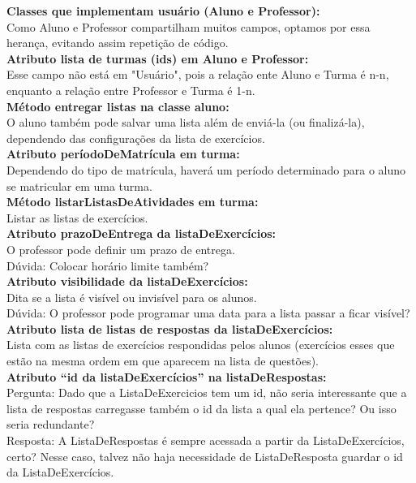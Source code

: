 \documentclass[12pt,letterpaper]{article}
\begin{document}
\textbf{Classes que implementam usuário (Aluno e Professor):}\\
Como Aluno e Professor compartilham muitos campos, optamos por essa herança, evitando assim repetição de código.\\

\textbf{Atributo lista de turmas (ids) em Aluno e Professor:}\\
Esse campo não está em "Usuário", pois a relação ente Aluno e Turma é n-n, enquanto a relação entre Professor e Turma é 1-n.\\

\textbf{Método entregar listas na classe aluno:}\\
O aluno também pode salvar uma lista além de enviá-la (ou finalizá-la), dependendo das configurações da lista de exercícios.\\

\textbf{Atributo períodoDeMatrícula em turma:}\\
Dependendo do tipo de matrícula, haverá um período determinado para o aluno se matricular em uma turma.\\

\textbf{Método listarListasDeAtividades em turma:}\\
Listar as listas de exercícios.\\

\textbf{Atributo prazoDeEntrega da listaDeExercícios:}\\
O professor pode definir um prazo de entrega.\\
Dúvida: Colocar horário limite também?\\

\textbf{Atributo visibilidade da listaDeExercícios:}\\
Dita se a lista é visível ou invisível para os alunos.\\
Dúvida: O professor pode programar uma data para a lista passar a ficar visível?\\

\textbf{Atributo lista de listas de respostas da listaDeExercícios:}\\
Lista com as listas de exercícios respondidas pelos alunos (exercícios esses que estão na mesma ordem em que aparecem na lista de questões).\\

\textbf{Atributo “id da listaDeExercícios” na listaDeRespostas: }\\
Pergunta: Dado que a ListaDeExercicios tem um id, não seria interessante que a lista de respostas carregasse também o id da lista a qual ela pertence? Ou isso seria redundante?\\
Resposta: A ListaDeRespostas é sempre acessada a partir da ListaDeExercícios, certo? Nesse caso, talvez não haja necessidade de ListaDeResposta guardar o id da ListaDeExercícios.\\
\end{document}
